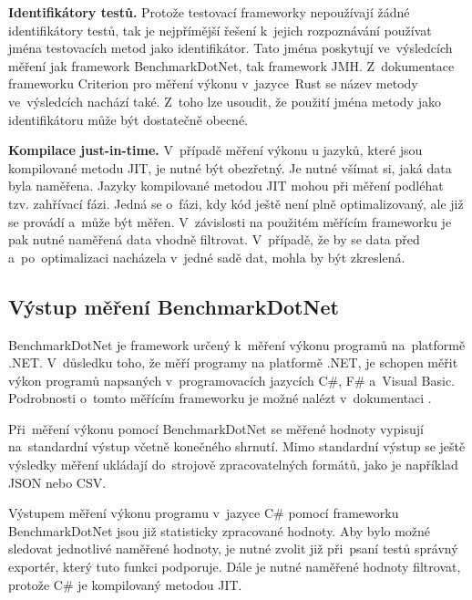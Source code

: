 \bigskip
\noindent\textbf{Identifikátory testů.} Protože testovací frameworky nepoužívají žádné identifikátory testů, tak je nejpřímější
řešení k~jejich rozpoznávání používat jména testovacích metod jako identifikátor. Tato jména poskytují ve~výsledcích
měření jak framework BenchmarkDotNet, tak framework JMH. Z~dokumentace frameworku Criterion \cite[]{criterion}
pro měření výkonu v~jazyce~Rust se název metody ve~výsledcích nachází také. Z~toho lze
usoudit, že použití jména metody jako identifikátoru může být dostatečně obecné.

\bigskip
\noindent\textbf{Kompilace just-in-time.} V~případě měření výkonu u jazyků, které jsou kompilované metodu JIT, je nutné být obezřetný. Je nutné
všímat si, jaká data byla naměřena. Jazyky kompilované metodou JIT mohou při měření podléhat tzv. zahřívací
fázi. Jedná se o~fázi, kdy kód ještě není plně optimalizovaný, ale již se provádí a~může být měřen.
V~závislosti na použitém měřícím frameworku je pak nutné naměřená data vhodně filtrovat. V~případě, že
by se data před a~po~optimalizaci nacházela v~jedné sadě dat, mohla by být zkreslená.

\subsection{Výstup měření BenchmarkDotNet}

BenchmarkDotNet je framework určený k~měření výkonu programů na~platformě .NET. V~důsledku
toho, že měří programy na platformě .NET, je schopen měřit výkon programů napsaných
v~programovacích jazycích C\#, F\# a~Visual Basic. Podrobnosti o~tomto měřícím frameworku
je možné nalézt v~dokumentaci \cite[]{benchmarkDotNet}.

Při~měření výkonu pomocí BenchmarkDotNet se měřené hodnoty vypisují na~standardní výstup
včetně konečného shrnutí. Mimo standardní výstup se ještě výsledky měření ukládají
do~strojově zpracovatelných formátů, jako je například JSON nebo CSV.

Výstupem měření výkonu programu v~jazyce C\# pomocí frameworku BenchmarkDotNet jsou již statisticky zpracované hodnoty.
Aby bylo možné sledovat jednotlivé naměřené hodnoty, je nutné zvolit již při~psaní testů správný
exportér, který tuto funkci podporuje. Dále je nutné naměřené hodnoty filtrovat, protože C\# je kompilovaný
metodou JIT.

